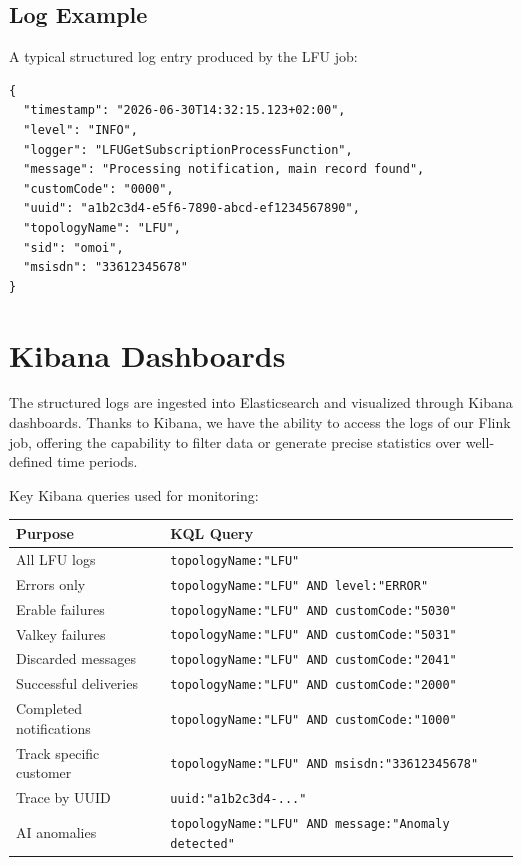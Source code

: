 \subsection{Log Example}

A typical structured log entry produced by the LFU job:

\begin{lstlisting}[caption={Structured JSON log entry example}]
{
  "timestamp": "2026-06-30T14:32:15.123+02:00",
  "level": "INFO",
  "logger": "LFUGetSubscriptionProcessFunction",
  "message": "Processing notification, main record found",
  "customCode": "0000",
  "uuid": "a1b2c3d4-e5f6-7890-abcd-ef1234567890",
  "topologyName": "LFU",
  "sid": "omoi",
  "msisdn": "33612345678"
}
\end{lstlisting}

\section{Kibana Dashboards}

The structured logs are ingested into Elasticsearch and visualized through Kibana dashboards. Thanks to Kibana, we have the ability to access the logs of our Flink job, offering the capability to filter data or generate precise statistics over well-defined time periods.

Key Kibana queries used for monitoring:

\begin{center}
    \begin{tabularx}{\textwidth}{|l|X|}
\toprule
\textbf{Purpose} & \textbf{KQL Query} \\
\midrule
All LFU logs & \texttt{topologyName:"LFU"} \\ \hline
Errors only & \texttt{topologyName:"LFU" AND level:"ERROR"} \\ \hline
Erable failures & \texttt{topologyName:"LFU" AND customCode:"5030"} \\ \hline
Valkey failures & \texttt{topologyName:"LFU" AND customCode:"5031"} \\ \hline
Discarded messages & \texttt{topologyName:"LFU" AND customCode:"2041"} \\ \hline
Successful deliveries & \texttt{topologyName:"LFU" AND customCode:"2000"} \\ \hline
Completed notifications & \texttt{topologyName:"LFU" AND customCode:"1000"} \\ \hline
Track specific customer & \texttt{topologyName:"LFU" AND msisdn:"33612345678"} \\ \hline
Trace by UUID & \texttt{uuid:"a1b2c3d4-..."} \\ \hline
AI anomalies & \texttt{topologyName:"LFU" AND message:"Anomaly detected"} \\
\bottomrule
    \end{tabularx}
    \label{tab:kibana-queries}
\end{center}


